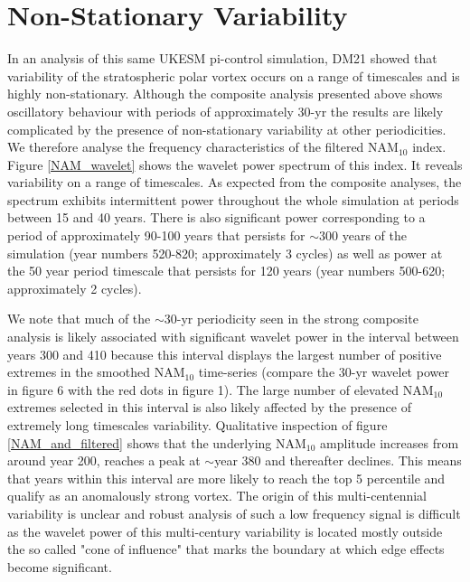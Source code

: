 \section{Non-Stationary Variability}
In an analysis of this same UKESM pi-control simulation, DM21 showed that variability of the stratospheric polar vortex  occurs on a range of timescales and is highly non-stationary. Although the composite analysis presented above shows oscillatory behaviour with periods of approximately 30-yr the results are likely complicated by the presence of  non-stationary variability at other periodicities.  We therefore analyse the frequency characteristics of the filtered NAM$_{10}$ index. Figure \ref{NAM_wavelet} shows the wavelet power spectrum of this index. It reveals variability on a range of timescales. As expected from the composite analyses, the spectrum exhibits intermittent power throughout the whole simulation at periods between 15 and 40 years. There is also significant power   corresponding to a period of approximately 90-100 years that persists for $\sim$300 years of the simulation (year numbers 520-820; approximately 3 cycles) as well as power at the 50 year period timescale that persists for 120 years (year numbers 500-620; approximately 2 cycles). 

We note that much of the $\sim$30-yr periodicity seen in the strong composite analysis is likely associated with significant wavelet power in the interval between years 300 and 410 because this interval displays the largest number of positive extremes in the smoothed NAM$_{10}$ time-series (compare the 30-yr wavelet power in figure 6 with  the red dots in figure 1). The large number of elevated NAM$_{10}$ extremes selected in this interval is also likely affected by the presence of extremely long timescales variability. Qualitative inspection of figure \ref{NAM_and_filtered} shows that the underlying NAM$_{10}$ amplitude increases from around year 200, reaches a peak at $\sim$year 380 and thereafter declines. This means that years within this interval are more likely to reach the top 5 percentile and qualify as an anomalously strong vortex. The origin of this multi-centennial variability is unclear and robust analysis of such a low frequency signal is difficult as the wavelet power of this multi-century variability is located mostly outside the so called "cone of influence" that marks the boundary at which edge effects become significant. 

